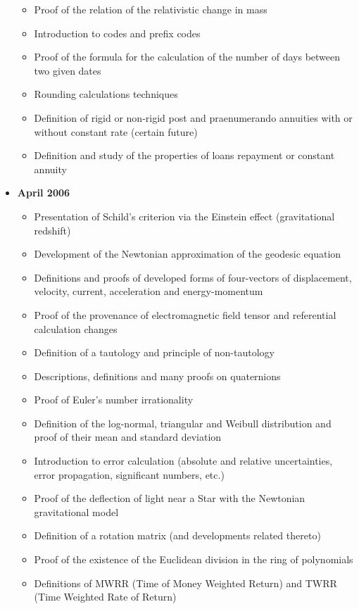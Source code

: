 \documentclass[12pt,a4paper,twoside,openright]{report}
\newcounter{def}
\theoremstyle{definition}
\theoremstyle{itexmp}
\numberwithin{equation}{section}
\begin{document}
\begin{itemize}
\begin{itemize}[noitemsep]
			\item Proof of the relation of the relativistic change in mass
			\item Introduction to codes and prefix codes
			\item Proof of the formula for the calculation of the number of days between two given dates 
			\item Rounding calculations techniques
			\item Definition of rigid or non-rigid post and praenumerando annuities with or without constant rate (certain future)
			\item Definition and study of the properties of loans repayment or constant annuity
		\end{itemize}
	\item \textbf{April 2006}
		\begin{itemize}[noitemsep]
			\item Presentation of Schild's criterion via the Einstein effect (gravitational redshift)
			\item Development of the Newtonian approximation of the geodesic equation
			\item Definitions and proofs of developed forms of four-vectors of displacement, velocity, current, acceleration and energy-momentum
			\item Proof of the provenance of electromagnetic field tensor and referential calculation changes
			\item Definition of a tautology and principle of non-tautology
			\item Descriptions, definitions and many proofs on quaternions
			\item Proof of Euler's number irrationality
			\item Definition of the log-normal, triangular and Weibull distribution and proof of their mean and standard deviation
			\item Introduction to error calculation (absolute and relative uncertainties, error propagation, significant numbers, etc.)
			\item Proof of the deflection of light near a Star with the Newtonian gravitational model
			\item Definition of a rotation matrix (and developments related thereto)
			\item Proof of the existence of the Euclidean division in the ring of polynomials
			\item Definitions of MWRR (Time of Money Weighted Return) and TWRR (Time Weighted Rate of Return)

\end{itemize}
\end{itemize}
\end{document}
